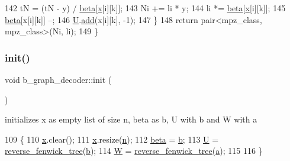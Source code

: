 \begin{DoxyCode}
142     tN = (tN - y) / \hyperlink{classb__graph__decoder_a3e5babfb07af486c1d9e991f65251266}{beta}[\hyperlink{classb__graph__decoder_a6bba2e67984f9733fc60c40dd4956587}{x}[i][k]];
143     Ni += li * y;
144     li *= \hyperlink{classb__graph__decoder_a3e5babfb07af486c1d9e991f65251266}{beta}[\hyperlink{classb__graph__decoder_a6bba2e67984f9733fc60c40dd4956587}{x}[i][k]];
145     \hyperlink{classb__graph__decoder_a3e5babfb07af486c1d9e991f65251266}{beta}[x[i][k]] --;
146     \hyperlink{classb__graph__decoder_ae15e74088bb60a096562a9bdaf380f2c}{U}.\hyperlink{classreverse__fenwick__tree_a942d7f49b37e53ebfec3076d177691d7}{add}(x[i][k], -1);
147   \}
148   \textcolor{keywordflow}{return} pair<mpz\_class, mpz\_class>(Ni, li);
149 \}
\end{DoxyCode}
\mbox{\label{classb__graph__decoder_a9498e8aa7391480cc663bffef3718c6b}} 
\subsubsection{\texorpdfstring{init()}{init()}}
{\footnotesize\ttfamily void b\+\_\+graph\+\_\+decoder\+::init (\begin{DoxyParamCaption}{ }\end{DoxyParamCaption})}



initializes x as empty list of size n, beta as b, U with b and W with a 


\begin{DoxyCode}
109 \{
110   \hyperlink{classb__graph__decoder_a6bba2e67984f9733fc60c40dd4956587}{x}.clear();
111   \hyperlink{classb__graph__decoder_a6bba2e67984f9733fc60c40dd4956587}{x}.resize(\hyperlink{classb__graph__decoder_a2caddd63df6808c95e2ee738f7c77870}{n});
112   \hyperlink{classb__graph__decoder_a3e5babfb07af486c1d9e991f65251266}{beta} = \hyperlink{classb__graph__decoder_a12d1a4a91f342111d2116196cb826317}{b};
113   \hyperlink{classb__graph__decoder_ae15e74088bb60a096562a9bdaf380f2c}{U} = \hyperlink{classreverse__fenwick__tree}{reverse\_fenwick\_tree}(\hyperlink{classb__graph__decoder_a12d1a4a91f342111d2116196cb826317}{b});
114   \hyperlink{classb__graph__decoder_a2c3f91db1f54ddfd411f74d18b01b606}{W} = \hyperlink{classreverse__fenwick__tree}{reverse\_fenwick\_tree}(\hyperlink{classb__graph__decoder_afcf783e4199fb8f9d6828db08bb12333}{a});
115   
116 \}
\end{DoxyCode}


